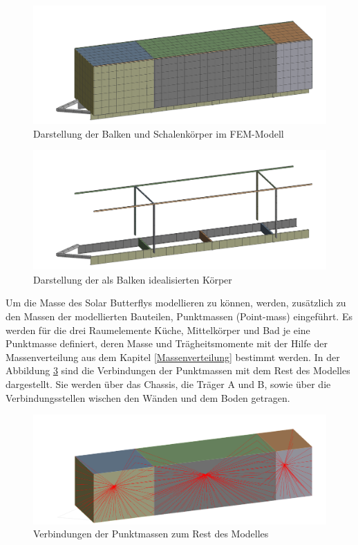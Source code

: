 \begin{figure}[H]
  \centering
  \centering
  \includegraphics[width=.7\linewidth]{04_figures/FEM Mesh1.png}
  \caption{Darstellung der Balken und Schalenkörper im FEM-Modell}
  \label{FEM Mesh1}
\end{figure}
\begin{figure}[H]
  \centering
  \includegraphics[width=.7\linewidth]{04_figures/FEM Mesh3.png}
  \caption{Darstellung der als Balken idealisierten Körper}
  \label{FEM Mesh3}
\end{figure}

Um die Masse des Solar Butterflys modellieren zu können, werden, zusätzlich zu den Massen der modellierten Bauteilen, Punktmassen (Point-mass) eingeführt. Es werden für die drei Raumelemente Küche, Mittelkörper und Bad je eine Punktmasse definiert, deren Masse und Trägheitsmomente mit der Hilfe der Massenverteilung aus dem Kapitel \ref{Massenverteilung} bestimmt werden. In der Abbildung \ref{img:FEM Punktmasse} sind die Verbindungen der Punktmassen mit dem Rest des Modelles dargestellt. Sie werden über das Chassis, die Träger A und B, sowie über die Verbindungsstellen wischen den Wänden und dem Boden getragen.\\
\begin{figure}[H]
  \centering
  \includegraphics[width=0.7\linewidth]{04_Figures/FEM Punktmasse.png}
  \caption{Verbindungen der Punktmassen zum Rest des Modelles}
  \label{img:FEM Punktmasse}
\end{figure}

